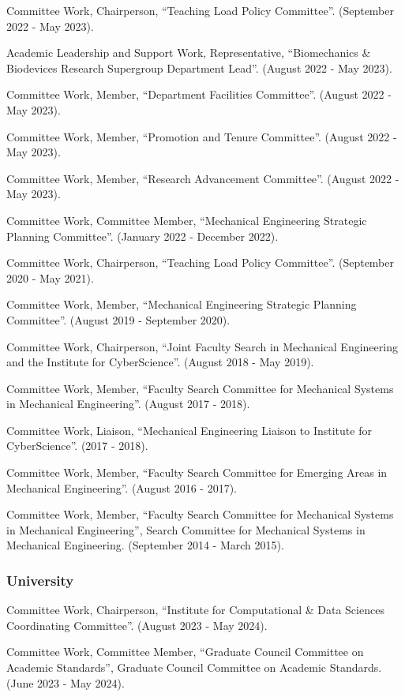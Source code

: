 \documentclass[11pt]{article}
\begin{document}
Committee Work, Chairperson, ``Teaching Load Policy
Committee''. 
(September 2022 - May 2023).

Academic Leadership and Support Work, Representative,
``Biomechanics \& Biodevices Research Supergroup Department Lead''.
(August 2022 - May 2023).

Committee Work, Member, ``Department Facilities Committee''.
(August 2022 - May 2023).

Committee Work, Member, ``Promotion and Tenure Committee''.
(August 2022 - May 2023).

Committee Work, Member, ``Research Advancement Committee''.
(August 2022 - May 2023).

Committee Work, Committee Member, ``Mechanical Engineering
Strategic Planning Committee''. 
(January 2022 - December 2022).

Committee Work, Chairperson, ``Teaching Load Policy
Committee''. 
(September 2020 - May 2021).

Committee Work, Member, ``Mechanical Engineering Strategic
Planning Committee''. 
(August 2019 - September 2020).

Committee Work, Chairperson, ``Joint Faculty Search in
Mechanical Engineering and the Institute for CyberScience''. 
(August 2018
- May 2019).

Committee Work, Member, ``Faculty Search Committee for
Mechanical Systems in Mechanical Engineering''. 
(August 2017 - 2018).

Committee Work, Liaison, ``Mechanical Engineering Liaison to
Institute for CyberScience''. 
(2017 - 2018).

Committee Work, Member, ``Faculty Search Committee for
Emerging Areas in Mechanical Engineering''. 
(August 2016 - 2017).

Committee Work, Member, ``Faculty Search Committee for
Mechanical Systems in Mechanical Engineering'', Search Committee for
Mechanical Systems in Mechanical Engineering. 
(September 2014 - March
2015).

\subsubsection{University}\label{university}

Committee Work, Chairperson, ``Institute for Computational \&
Data Sciences Coordinating Committee''. 
(August 2023 - May 2024).

Committee Work, Committee Member, ``Graduate Council
Committee on Academic Standards'', Graduate Council Committee on Academic
Standards. 
(June 2023 - May 2024).
\end{document}
